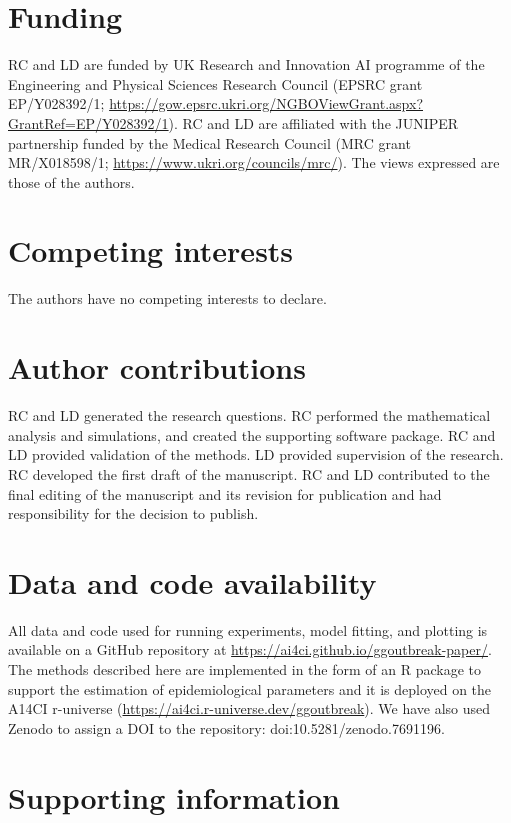 \documentclass[10pt,letterpaper]{article}
\begin{document}
\nolinenumbers



\section*{Funding}

RC and LD are funded by UK Research and Innovation AI programme of the Engineering and Physical Sciences Research Council (EPSRC grant EP/Y028392/1;  \url{https://gow.epsrc.ukri.org/NGBOViewGrant.aspx?GrantRef=EP/Y028392/1}). RC and LD are affiliated with the JUNIPER partnership funded by the Medical Research Council (MRC grant MR/X018598/1; \url{https://www.ukri.org/councils/mrc/}). The views expressed are those of the authors.

\section*{Competing interests}

The authors have no competing interests to declare.

\section*{Author contributions}

RC and LD generated the research questions. RC performed the mathematical analysis and simulations, and created the supporting software package. RC and LD provided validation of the methods. LD provided supervision of the research. RC developed the first draft of the manuscript. RC and LD contributed to the final editing of the manuscript and its revision for publication and had responsibility for the decision to publish.

\section*{Data and code availability}

All data and code used for running experiments, model fitting, and plotting is available on a GitHub repository at \url{https://ai4ci.github.io/ggoutbreak-paper/}. The methods described here are implemented in the form of an R package to support the estimation of epidemiological parameters and it is deployed on the A14CI r-universe (\url{https://ai4ci.r-universe.dev/ggoutbreak}). We have also used Zenodo to assign a DOI to the repository: doi:10.5281/zenodo.7691196.

\section*{Supporting information}
\end{document}
